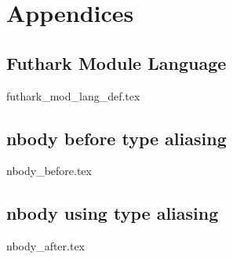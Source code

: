\section{Appendices}
\subsection{Futhark Module Language}
{futhark_mod_lang_def.tex}
\clearpage
\subsection{nbody before type aliasing\label{nbody_before}}
{nbody_before.tex}
\clearpage
\subsection{nbody using type aliasing\label{nbody_after}}
{nbody_after.tex}
